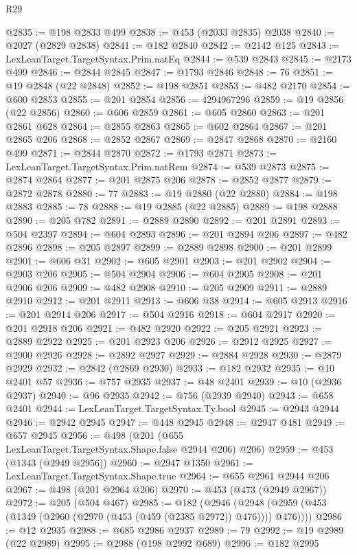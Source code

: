 \begin{lexlean}{R29}
\begin{coremodule}
@2835 := @198 @2833 @499
@2838 := @453 (@2033 @2835) @2038
@2840 := @2027 (@2829 @2838)
@2841 := @182 @2840
@2842 := @2142 @125
@2843 := LexLeanTarget.TargetSyntax.Prim.natEq
@2844 := @539 @2843
@2845 := @2173 @499
@2846 := @2844 @2845
@2847 := @1793 @2846
@2848 := 76
@2851 := @19 @2848 (@22 @2848)
@2852 := @198 @2851
@2853 := @482 @2170
@2854 := @600 @2853
@2855 := @201 @2854
@2856 := 4294967296
@2859 := @19 @2856 (@22 @2856)
@2860 := @606 @2859
@2861 := @605 @2860
@2863 := @201 @2861 @628
@2864 := @2855 @2863
@2865 := @602 @2864
@2867 := @201 @2865 @206
@2868 := @2852 @2867
@2869 := @2847 @2868
@2870 := @2160 @499
@2871 := @2844 @2870
@2872 := @1793 @2871
@2873 := LexLeanTarget.TargetSyntax.Prim.natRem
@2874 := @539 @2873
@2875 := @2874 @2864
@2877 := @201 @2875 @206
@2878 := @2852 @2877
@2879 := @2872 @2878
@2880 := 77
@2883 := @19 @2880 (@22 @2880)
@2884 := @198 @2883
@2885 := 78
@2888 := @19 @2885 (@22 @2885)
@2889 := @198 @2888
@2890 := @205 @782
@2891 := @2889 @2890
@2892 := @201 @2891
@2893 := @504 @2397
@2894 := @604 @2893
@2896 := @201 @2894 @206
@2897 := @482 @2896
@2898 := @205 @2897
@2899 := @2889 @2898
@2900 := @201 @2899
@2901 := @606 @31
@2902 := @605 @2901
@2903 := @201 @2902
@2904 := @2903 @206
@2905 := @504 @2904
@2906 := @604 @2905
@2908 := @201 @2906 @206
@2909 := @482 @2908
@2910 := @205 @2909
@2911 := @2889 @2910
@2912 := @201 @2911
@2913 := @606 @38
@2914 := @605 @2913
@2916 := @201 @2914 @206
@2917 := @504 @2916
@2918 := @604 @2917
@2920 := @201 @2918 @206
@2921 := @482 @2920
@2922 := @205 @2921
@2923 := @2889 @2922
@2925 := @201 @2923 @206
@2926 := @2912 @2925
@2927 := @2900 @2926
@2928 := @2892 @2927
@2929 := @2884 @2928
@2930 := @2879 @2929
@2932 := @2842 (@2869 @2930)
@2933 := @182 @2932
@2935 := @10 @2401 @57
@2936 := @757 @2935
@2937 := @48 @2401
@2939 := @10 (@2936 @2937)
@2940 := @96 @2935
@2942 := @756 (@2939 @2940)
@2943 := @658 @2401
@2944 := LexLeanTarget.TargetSyntax.Ty.bool
@2945 := @2943 @2944
@2946 := @2942 @2945
@2947 := @448 @2945
@2948 := @2947 @481
@2949 := @657 @2945
@2956 := @498 (@201 (@655 LexLeanTarget.TargetSyntax.Shape.false @2944 @206) @206)
@2959 := @453 (@1343 (@2949 @2956))
@2960 := @2947 @1350
@2961 := LexLeanTarget.TargetSyntax.Shape.true
@2964 := @655 @2961 @2944 @206
@2967 := @498 (@201 @2964 @206)
@2970 := @453 (@473 (@2949 @2967))
@2972 := @205 (@504 @467)
@2985 := @182
    (@2946 (@2948 (@2959 (@453 (@1349 (@2960 (@2970 (@453 (@459 (@2385 @2972)) @476)))) @476))))
@2986 := @12 @2935
@2988 := @685 @2986 @2937
@2989 := 79
@2992 := @19 @2989 (@22 @2989)
@2995 := @2988 (@198 @2992 @689)
@2996 := @182 @2995

\end{coremodule}
\end{lexlean}
